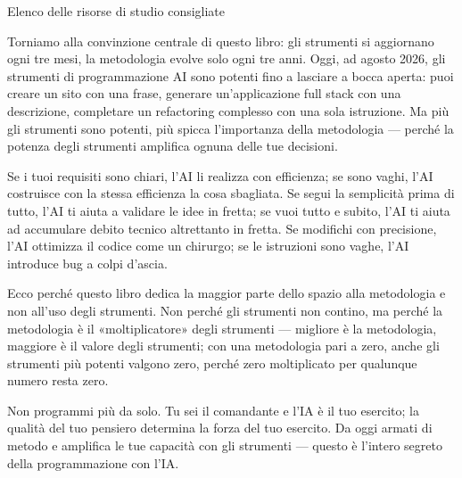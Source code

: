 \begin{center}\small\color{gray}Elenco delle risorse di studio consigliate\end{center}


Torniamo alla convinzione centrale di questo libro: gli strumenti si aggiornano ogni tre mesi, la metodologia evolve solo ogni tre anni. Oggi, ad agosto 2026, gli strumenti di programmazione AI sono potenti fino a lasciare a bocca aperta: puoi creare un sito con una frase, generare un'applicazione full stack con una descrizione, completare un refactoring complesso con una sola istruzione. Ma più gli strumenti sono potenti, più spicca l'importanza della metodologia — perché la potenza degli strumenti amplifica ognuna delle tue decisioni.

Se i tuoi requisiti sono chiari, l'AI li realizza con efficienza; se sono vaghi, l'AI costruisce con la stessa efficienza la cosa sbagliata. Se segui la semplicità prima di tutto, l'AI ti aiuta a validare le idee in fretta; se vuoi tutto e subito, l'AI ti aiuta ad accumulare debito tecnico altrettanto in fretta. Se modifichi con precisione, l'AI ottimizza il codice come un chirurgo; se le istruzioni sono vaghe, l'AI introduce bug a colpi d'ascia.

Ecco perché questo libro dedica la maggior parte dello spazio alla metodologia e non all'uso degli strumenti. Non perché gli strumenti non contino, ma perché la metodologia è il «moltiplicatore» degli strumenti — migliore è la metodologia, maggiore è il valore degli strumenti; con una metodologia pari a zero, anche gli strumenti più potenti valgono zero, perché zero moltiplicato per qualunque numero resta zero.

Non programmi più da solo. Tu sei il comandante e l'IA è il tuo esercito; la qualità del tuo pensiero determina la forza del tuo esercito. Da oggi armati di metodo e amplifica le tue capacità con gli strumenti — questo è l'intero segreto della programmazione con l'IA.


